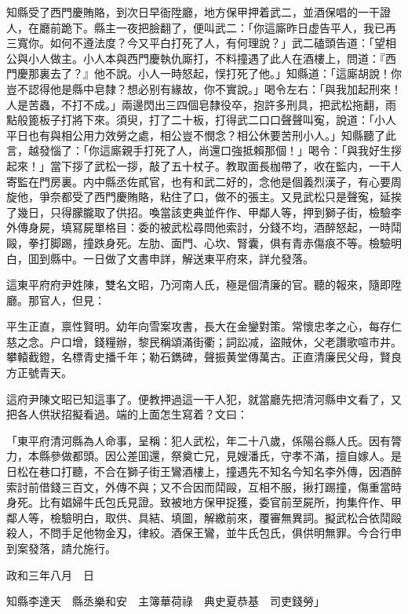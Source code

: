 知縣受了西門慶賄賂，到次日早衙陞廳，地方保甲押着武二，並酒保唱的一干證人，在廳前跪下。縣主一夜把臉翻了，便叫武二：「你這廝昨日虚告平人，我已再三寬你。如何不遵法度？今又平白打死了人，有何理說？」武二磕頭告道：「望相公與小人做主。小人本與西門慶執仇廝打，不料撞遇了此人在酒樓上，問道：『西門慶那裏去了？』他不說。小人一時怒起，悮打死了他。」知縣道：「這廝胡說！你豈不認得他是縣中皂隸？想必别有緣故，你不實說。」喝令左右：「與我加起刑來！人是苦蟲，不打不成。」兩邊閃出三四個皂隸役卒，抱許多刑具，把武松拖翻，雨點般篦板子打將下來。須臾，打了二十板，打得武二口口聲聲叫寃，說道：「小人平日也有與相公用力效勞之處，相公豈不憫念？相公休要苦刑小人。」知縣聽了此言，越發惱了：「你這廝親手打死了人，尚還口強抵賴那個！」喝令：「與我好生拶起來！」當下拶了武松一拶，敲了五十杖子。教取面長枷帶了，收在監内，一干人寄監在門房裏。内中縣丞佐貳官，也有和武二好的，念他是個義烈漢子，有心要周旋他，爭奈都受了西門慶賄賂，粘住了口，做不的張主。又見武松只是聲寃，延挨了幾日，只得朦朧取了供招。喚當該吏典並仵作、甲鄰人等，押到獅子街，檢驗李外傳身屍，填冩屍單格目：委的被武松尋問他索討，分錢不均，酒醉怒起，一時鬦毆，拳打脚踢，撞跌身死。左肋、面門、心坎、腎囊，俱有青赤傷痕不等。檢驗明白，囬到縣中。一日做了文書申詳，解送東平府來，詳允發落。

這東平府府尹姓陳，雙名文昭，乃河南人氏，極是個清廉的官。聽的報來，隨即陞廳。那官人，但見：

平生正直，禀性賢明。幼年向雪案攻書，長大在金鑾對策。常懷忠孝之心，每存仁慈之念。户口增，錢糧辦，黎民稱頌滿街衢；詞訟减，盜賊休，父老讚歌喧市井。攀轅截鐙，名標青史播千年；勒石鐫碑，聲振黄堂傳萬古。正直清廉民父母，賢良方正號青天。

這府尹陳文昭已知這事了。便教押過這一干人犯，就當廳先把清河縣申文看了，又把各人供狀招擬看過。端的上面怎生寫着？文曰：

「東平府清河縣為人命事，呈稱：犯人武松，年二十八歲，係陽谷縣人氏。因有膂力，本縣參做都頭。因公差囬還，祭奠亡兄，見嫂潘氏，守孝不滿，擅自嫁人。是日松在巷口打聽，不合在獅子街王鸞酒樓上，撞遇先不知名今知名李外傳，因酒醉索討前借錢三百文，外傳不與；又不合因而鬦毆，互相不服，揪打踢撞，傷重當時身死。比有娼婦牛氏包氏見證。致被地方保甲捉獲，委官前至屍所，拘集仵作、甲鄰人等，檢驗明白，取供、具結、填圖，解繳前來，覆審無異詞。擬武松合依鬦毆殺人，不問手足他物金刄，律絞。酒保王鸞，並牛氏包氏，俱供明無罪。今合行申到案發落，請允施行。

政和三年八月　日　

知縣李達天　縣丞樂和安　主簿華荷祿　典史夏恭基　司吏錢勞」


